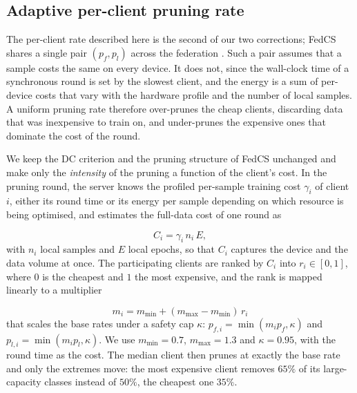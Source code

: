 \documentclass[conference]{IEEEtran}
\begin{document}
\subsection{Adaptive per-client pruning rate}\label{sec:adaptive}
The per-client rate described here is the second of our two corrections; FedCS shares a
single pair $(p_f, p_l)$ across the federation \cite{fedcs}. Such a pair assumes that a
sample costs the same on every device. It does not, since the wall-clock time of a synchronous round is set by the slowest client, and the energy is a sum of per-device costs that vary with the hardware profile and the number of local samples. A uniform pruning rate therefore over-prunes the cheap clients, discarding data that was inexpensive to train on, and under-prunes the expensive ones that dominate the cost of the round.

We keep the DC criterion and the pruning structure of FedCS unchanged and make only the
\emph{intensity} of the pruning a function of the client's cost. In the pruning round,
the server knows the profiled per-sample training cost $\gamma_i$ of client $i$,
either its round time or its energy per sample depending on which resource is being
optimised, and estimates the full-data cost of one round as

\begin{equation}
C_i = \gamma_i \, n_i \, E ,
\label{eq:cost}
\end{equation}
with $n_i$ local samples and $E$ local epochs, so that $C_i$ captures the device and
the data volume at once. The participating clients are ranked by $C_i$ into
$r_i \in [0,1]$, where $0$ is the cheapest and $1$ the most expensive, and the rank is
mapped linearly to a multiplier

\begin{equation}
m_i = m_{\min} + (m_{\max} - m_{\min})\, r_i
\label{eq:mult}
\end{equation}
that scales the base rates under a safety cap $\kappa$:
$p_{f,i} = \min(m_i p_f, \kappa)$ and $p_{l,i} = \min(m_i p_l, \kappa)$. We use
$m_{\min} = 0.7$, $m_{\max} = 1.3$ and $\kappa = 0.95$, with the round time as the
cost. The median client then prunes at exactly the base rate and only the extremes
move: the most expensive client removes $65\%$ of its large-capacity classes instead of
$50\%$, the cheapest one $35\%$.
\end{document}
